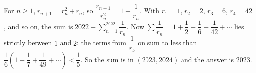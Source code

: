For $n\ge1$, $r_{n+1}=r_n^2+r_n$, so $\dfrac{r_{n+1}}{r_n^2}=1+\dfrac1{r_n}$. With $r_1=1$, $r_2=2$, $r_3=6$, $r_4=42$, and so on, the sum is $2022+\sum_{n=1}^{2022}\dfrac1{r_n}$. Now $\sum\dfrac1{r_n}=1+\dfrac12+\dfrac16+\dfrac1{42}+\cdots$ lies strictly between $1$ and $2$: the terms from $\dfrac1{r_3}$ on sum to less than $\dfrac16\left(1+\dfrac17+\dfrac1{49}+\cdots\right)<\dfrac15$. So the sum is in $(2023,2024)$ and the answer is $\boxed{2023}$.
